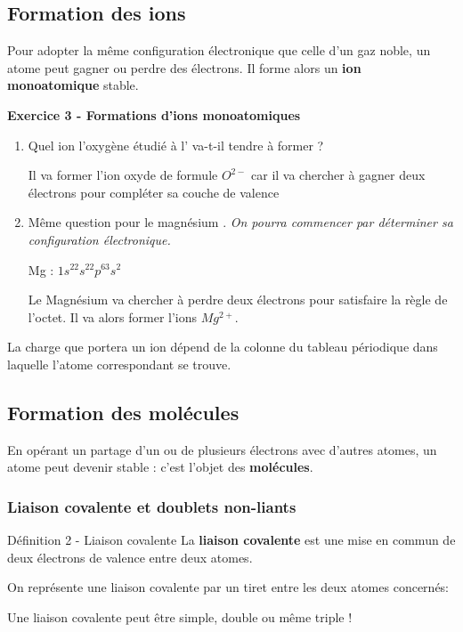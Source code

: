 \documentclass[french, a4paper, 12pt]{article}
\newcommand{\exo}[3]{
	\begin{mdframed}[style=exo, leftmargin=0pt, rightmargin=0pt, innertopmargin=8pt, innerbottommargin=8pt, innerrightmargin=10pt, innerleftmargin=10pt]

		\noindent \textbf{Exercice #1 - #2}\medskip

		#3
	\end{mdframed}
}
\begin{document}
\subsection{Formation des ions}

Pour adopter la même configuration électronique que celle d'un gaz
noble, un atome peut gagner ou perdre des électrons. Il forme alors un \textbf{ion monoatomique} stable.

\exo{3}{Formations d'ions monoatomiques}{
\begin{enumerate}
	\item Quel ion l'oxygène étudié à l'\bsc{exercice 2} va-t-il tendre à former ?\medskip
	
	Il va former l'ion oxyde de formule $O^{2-}$ car il va chercher à gagner deux électrons pour compléter sa couche de valence

	\item Même question pour le magnésium \isotope{24}{12}{Mg}.  \textit{On pourra commencer par déterminer sa configuration électronique.}\medskip
	
	Mg : $1s^22s^22p^63s^2$

	Le Magnésium va chercher à perdre deux électrons pour satisfaire la règle de l'octet. Il va alors former l'ions $Mg^{2+}$.
\end{enumerate}
}

La charge que portera un ion dépend de la colonne du tableau périodique
dans laquelle l’atome correspondant se trouve.

\subsection{Formation des molécules}

En opérant un partage d'un ou de plusieurs électrons avec d'autres atomes, un atome peut devenir stable : c'est l'objet des \textbf{molécules}.

\subsubsection{Liaison covalente et doublets non-liants}

\begin{definition}{Définition 2 - Liaison covalente}
	La \textbf{liaison covalente} est une mise en commun de deux électrons de valence entre deux atomes.
\end{definition}


On représente une liaison covalente par un tiret entre les deux atomes concernés:
\begin{center}
\hspace{3cm} \hspace{3cm} 
\end{center}
Une liaison covalente peut être simple, double ou même triple ! 
\end{document}
